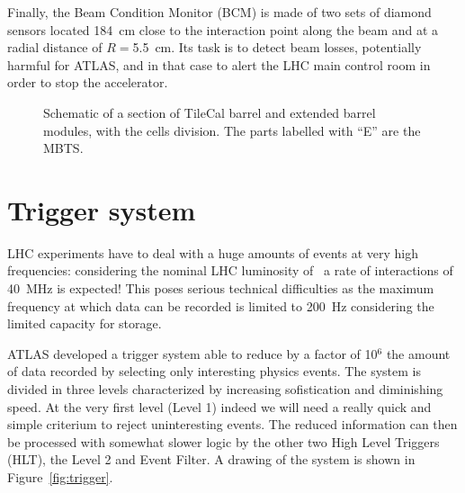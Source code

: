 Finally, the Beam Condition Monitor (BCM) is made of two sets of diamond sensors located 184~cm close
to the interaction point along the beam and 
at a radial distance of $R=$5.5~cm. Its task is to detect beam losses,
potentially harmful for ATLAS, and in that case to alert 
the LHC main control room in order to stop the accelerator.



\begin{figure}[tb]\begin{center}
	\caption{Schematic of a section of TileCal barrel and extended barrel modules, with the
        cells division. The parts labelled with ``E'' are the MBTS.\label{fig:extendedbarrel}}
\end{center}\end{figure}


\section{Trigger system}\label{sec:trigger}

LHC experiments have to deal with a huge amounts of events
at very high frequencies: considering the nominal LHC
luminosity of \highL\ a rate of interactions of 40~MHz is expected!
This poses serious technical difficulties as the maximum frequency
at which data can be recorded is limited to 200~Hz considering the
limited capacity for storage.

ATLAS developed a trigger system able to reduce by a factor of 10$^6$
the amount of data recorded by selecting only interesting physics events.
The system is divided in three levels characterized by increasing sofistication
and diminishing speed. At the very first level (Level 1) 
indeed we will need a really quick and
simple criterium to reject uninteresting events. 
The reduced information can then be
processed with somewhat slower logic by 
the other two High Level Triggers (HLT), the
Level 2 and Event Filter.
A drawing of the system is shown in Figure~\ref{fig:trigger}.

